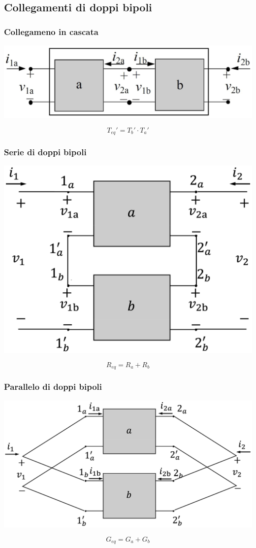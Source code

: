 \documentclass[a4paper]{article}
\begin{document}
\subsection{Collegamenti di doppi bipoli}
\begin{multicols}{2}
	\subsubsection*{Collegameno in cascata}
	\begin{center}
		\includegraphics[width=0.8\linewidth]{dbp_cascata.png}
	\end{center}
	\[T_{eq}' = T_b' \cdot T_a'\]
	
	\subsubsection*{Serie di doppi bipoli}
	\begin{center}
		\includegraphics[width=0.7\linewidth]{dbp_serie.png}
	\end{center}
	\[R_{eq} = R_a + R_b\]
	
	\subsubsection*{Parallelo di doppi bipoli}
	\begin{center}
		\includegraphics[width=0.9\linewidth]{dbp_parallelo.png}
	\end{center}
	\[G_{eq} = G_a + G_b\]


\end{multicols}
\end{document}
